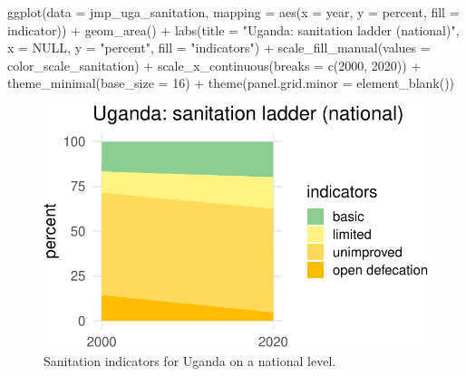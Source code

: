 \documentclass[
  letterpaper,
  DIV=11,
  numbers=noendperiod]{scrartcl}
\newenvironment{Shaded}{\begin{snugshade}}{\end{snugshade}}
\newcommand{\AttributeTok}[1]{\textcolor[rgb]{0.40,0.45,0.13}{#1}}
\newcommand{\ConstantTok}[1]{\textcolor[rgb]{0.56,0.35,0.01}{#1}}
\newcommand{\DecValTok}[1]{\textcolor[rgb]{0.68,0.00,0.00}{#1}}
\newcommand{\FunctionTok}[1]{\textcolor[rgb]{0.28,0.35,0.67}{#1}}
\newcommand{\NormalTok}[1]{\textcolor[rgb]{0.00,0.23,0.31}{#1}}
\newcommand{\SpecialCharTok}[1]{\textcolor[rgb]{0.37,0.37,0.37}{#1}}
\newcommand{\StringTok}[1]{\textcolor[rgb]{0.13,0.47,0.30}{#1}}
\begin{document}
\begin{Shaded}
\begin{Highlighting}[]
\FunctionTok{ggplot}\NormalTok{(}\AttributeTok{data =}\NormalTok{ jmp\_uga\_sanitation, }
       \AttributeTok{mapping =} \FunctionTok{aes}\NormalTok{(}\AttributeTok{x =}\NormalTok{ year, }
                     \AttributeTok{y =}\NormalTok{ percent, }
                     \AttributeTok{fill =}\NormalTok{ indicator)) }\SpecialCharTok{+}
  \FunctionTok{geom\_area}\NormalTok{() }\SpecialCharTok{+}
  \FunctionTok{labs}\NormalTok{(}\AttributeTok{title =} \StringTok{"Uganda: sanitation ladder (national)"}\NormalTok{,}
       \AttributeTok{x =} \ConstantTok{NULL}\NormalTok{, }\AttributeTok{y =} \StringTok{"percent"}\NormalTok{, }\AttributeTok{fill =} \StringTok{"indicators"}\NormalTok{) }\SpecialCharTok{+}
  \FunctionTok{scale\_fill\_manual}\NormalTok{(}\AttributeTok{values =}\NormalTok{ color\_scale\_sanitation) }\SpecialCharTok{+}
  \FunctionTok{scale\_x\_continuous}\NormalTok{(}\AttributeTok{breaks =} \FunctionTok{c}\NormalTok{(}\DecValTok{2000}\NormalTok{, }\DecValTok{2020}\NormalTok{)) }\SpecialCharTok{+}
  \FunctionTok{theme\_minimal}\NormalTok{(}\AttributeTok{base\_size =} \DecValTok{16}\NormalTok{) }\SpecialCharTok{+}
  \FunctionTok{theme}\NormalTok{(}\AttributeTok{panel.grid.minor =} \FunctionTok{element\_blank}\NormalTok{()) }
\end{Highlighting}
\end{Shaded}

\begin{figure}[H]

{\centering \includegraphics{index_files/figure-pdf/fig-san-uga-1.pdf}

}

\caption{\label{fig-san-uga}Sanitation indicators for Uganda on a
national level.}

\end{figure}
\end{document}
